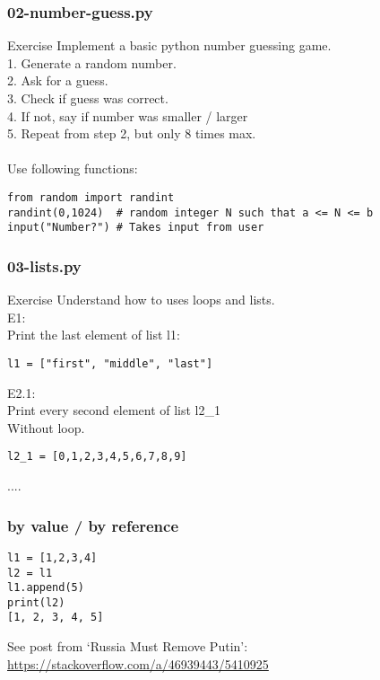 \documentclass{beamer}
\begin{document}
\begin{frame}[fragile]
	\frametitle{02-number-guess.py}
	\begin{exampleblock}{Exercise}
Implement a basic python number guessing game.\\
1. Generate a random number.\\
2. Ask for a guess.\\
3. Check if guess was correct.\\
4. If not, say if number was smaller / larger\\
5. Repeat from step 2, but only 8 times max.\\
~\\
Use following functions:
		\begin{verbatim}
from random import randint
randint(0,1024)  # random integer N such that a <= N <= b
input("Number?") # Takes input from user
		\end{verbatim}
	\end{exampleblock}
\end{frame}


\begin{frame}[fragile]
	\frametitle{03-lists.py}
	\begin{exampleblock}{Exercise}
		Understand how to uses loops and lists.\\
E1:\\
Print the last element of list l1:
\begin{verbatim}
l1 = ["first", "middle", "last"]
\end{verbatim}
E2.1:\\
Print every second element of list l2\_1\\
Without loop.
\begin{verbatim}
l2_1 = [0,1,2,3,4,5,6,7,8,9]
\end{verbatim}
....
	\end{exampleblock}
\end{frame}

\begin{frame}[fragile]
	\frametitle{by value / by reference}
		\begin{example}
			\begin{verbatim}
l1 = [1,2,3,4]
l2 = l1
l1.append(5)
print(l2)
[1, 2, 3, 4, 5]
			\end{verbatim}
		\end{example}

See post from `Russia Must Remove Putin': \url{https://stackoverflow.com/a/46939443/5410925}	

\end{frame}
\end{document}
